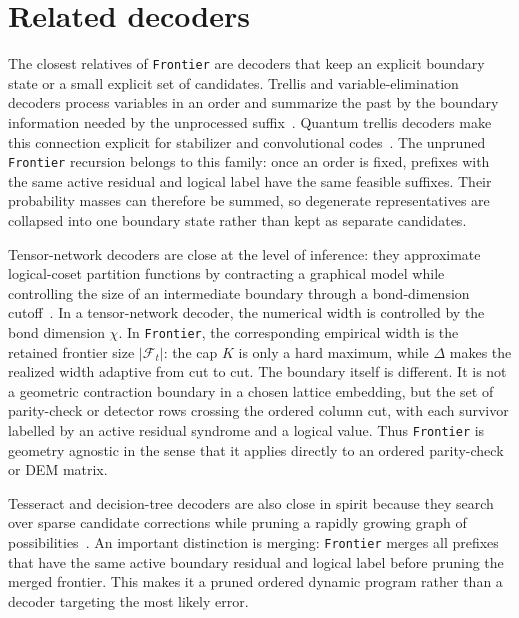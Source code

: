 \documentclass[a4paper,twocolumn,11pt,unpublished]{quantumarticle}
\newcommand{\frontier}{\texttt{Frontier}}
\begin{document}
\section{Related decoders}
\label{sec:related}

The closest relatives of \frontier{} are decoders that keep an explicit boundary state or a small explicit set of candidates.  Trellis and variable-elimination decoders process variables in an order and summarize the past by the boundary information needed by the unprocessed suffix~\cite{Forney1973Viterbi,Bahl1974BCJR,Kschischang2001FactorGraphs,Dechter1999BucketElimination}.  Quantum trellis decoders make this connection explicit for stabilizer and convolutional codes~\cite{OllivierTillich2006Trellises,PelchatPoulin2013DegenerateViterbi,SaboAloshiousBrown2024TrellisQudit}. The unpruned \frontier{} recursion belongs to this family: once an order is fixed, prefixes with the same active residual and logical label have the same feasible suffixes. Their probability masses can therefore be summed, so degenerate representatives are collapsed into one boundary state rather than kept as separate candidates.


Tensor-network decoders are close at the level of inference: they approximate
logical-coset partition functions by contracting a graphical model while
controlling the size of an intermediate boundary through a bond-dimension
cutoff~\cite{Bravyi2014TensorNetwork,FerrisPoulin2014TensorQEC,Chubb2021GeneralTNDecoding,PiveteauChubbRenes2024TNBeyond2D}.
In a tensor-network decoder, the numerical width is controlled by the bond
dimension \(\chi\). In \frontier{}, the corresponding empirical width is the
retained frontier size \(|\mathcal F_t|\): the cap \(K\) is only a hard maximum,
while \(\Delta\) makes the realized width adaptive from cut to cut. The boundary
itself is different. It is not a geometric contraction boundary in a chosen
lattice embedding, but the set of parity-check or detector rows crossing the
ordered column cut, with each survivor labelled by an active residual syndrome
and a logical value. Thus \frontier{} is geometry agnostic in the sense
that it applies directly to an ordered parity-check or DEM matrix.

Tesseract and decision-tree decoders are also close in spirit because they search over sparse candidate corrections while pruning a rapidly growing graph of possibilities~\cite{AghababaieBeni2025Tesseract,Ott2025DecisionTree}.  An important distinction is merging: \frontier{} merges all prefixes that have the same active boundary residual and logical label before pruning the merged frontier.  This makes it a pruned ordered dynamic program rather than a decoder targeting the most likely error.
\end{document}
